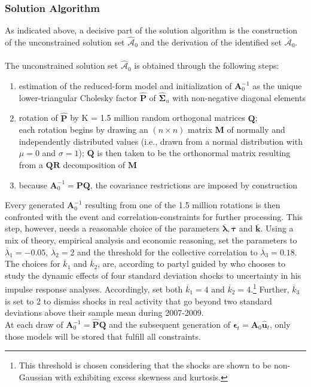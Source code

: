 \documentclass[a4paper,11pt,listof=nochaptergap,oneside,pointednumbers,bibtotoc,bigheadings,liststotoc]{scrbook}
\theoremstyle{mysatz}
\theoremstyle{mydefinition}
\theoremstyle{mybemerkung}
\renewcommand*{\paragraph}[1]{\subsubsection*{#1} \vspace{-3mm}} %
\let\oldhat\hat
\newcommand{\vect}[1]{\boldsymbol{\mathbf{#1}}}
\newcommand{\hatt}[1]{\oldhat{\boldsymbol{\mathbf{#1}}}}
\begin{document}
\paragraph{Solution Algorithm}
As indicated above, a decisive part of the solution algorithm is the construction of the unconstrained solution set $\hatt{\mathcal{A}}_0$ and the derivation of the identified set $\overline{\vect{\mathcal{A}}}_0$. \\
\\
The unconstrained solution set $\hatt{\mathcal{A}}_0$ is obtained through the following steps:
\begin{enumerate}[i]
	\item estimation of the reduced-form model and initialization of $\vect{A}_0^{-1}$ as the unique lower-triangular Cholesky factor $\hatt{\vect{P}}$ of $\hatt{\vect{\Sigma}}_u$ with non-negative diagonal elements
	\item rotation of $\hatt{\vect{P}}$ by K = 1.5 million random orthogonal matrices $\vect{Q}$;\\
	 each rotation begins by drawing an $(n \times n)$ matrix $\vect{M}$ of normally and independently distributed values (i.e., drawn from a normal distribution with $\mu = 0$ and $\sigma = 1$); $\vect{Q}$ is then taken to be the orthonormal matrix resulting from a $\vect{Q}\vect{R}$ decomposition of $\vect{M}$
	 \item because $\vect{A}_0^{-1} = \vect{P}\vect{Q}$, the covariance restrictions are imposed by construction 
\end{enumerate}

Every generated $\vect{A}_0^{-1}$ resulting from one of the 1.5 million rotations is then confronted with the event and correlation-constraints for further processing. This step, however, needs a reasonable choice of the parameters $\overline{\vect{\lambda}}, \overline{\vect{\tau}}$ and $\overline{\vect{k}}$. Using a mix of theory, empirical analysis and economic reasoning, \citet{ludvigsonetal:18} set the parameters to  $\overline{\lambda}_1 = -0.05$, $\overline{\lambda}_2 = 2$ and the threshold for the collective correlation to $\overline{\lambda}_3 = 0.18$. The choices for $\overline{k}_1$ and $\overline{k}_2$, are, according to \citet{ludvigsonetal:18} partyl guided by \citet{bloom:09} who chooses to study the dynamic effects of four standard deviation shocks to uncertainty in his impulse response analyses. Accordingly, \citet{ludvigsonetal:18} set both $\overline{k}_1 = 4$ and $\overline{k}_2 = 4$.\footnote{This threshold is chosen considering that the shocks are shown to be non-Gaussian with exhibiting excess skewness and kurtosis.} Further, $\overline{k}_3$ is set to 2 to dismiss shocks in real activity that go beyond two standard deviations above their sample mean during 2007-2009.
\\
At each draw of $\vect{A}_0^{-1} = \hatt{\vect{P}}\vect{Q}$ and the subsequent generation of $\vect{\epsilon}_t = \vect{A}_0\hatt{\vect{u}}_t$, only those models will be stored that fulfill all constraints.
\end{document}
